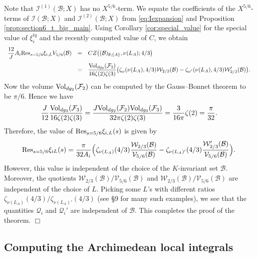 \documentclass{article}
\def\Res{{\rm Res}}
\def\Vol{{\rm Vol}}
\def\cB{{\mathcal B}}
\def\FF{{\mathcal F}}
\def\V{{\mathcal V}}
\def\I{{\mathcal I}}
\def\W{{\mathcal W}}
\newenvironment{proof}{\noindent {\bf Proof:}}{$\Box$ \vspace{2 ex}}
\begin{document}
\begin{proof}
Note that $\I^{(1)}(\cB;X)$ has no $X^{5/6}$-term. We equate the coefficients of the $X^{5/6}$-terms of $\I(\cB;X)$ and $\I^{(2)}(\cB;X)$ from \eqref{eq:Iexpansion} and Proposition \ref{prop:section6_t_big_main}. Using Corollary \ref{cor:special_value} for the special value of $\xi_i^{tq}$ and the recently computed value of $C$, we obtain
\begin{equation*}
\begin{array}{rcl}
\displaystyle\frac{12}{J}A_i\Res_{s=5/6}\xi_{i,L}V_{5/6}(\cB)
&=&\displaystyle
CZ\bigl((\cB)_{\emptyset;\{A\}},\nu(L_A);4/3\bigr)
\\[.15in]&=&\displaystyle
\frac{\Vol_{dg_3}(\FF_3)}{16\zeta(2)\zeta(3)}\bigl(
\zeta_{\omega}(\nu(L_A),4/3)\mathcal W_{2/3}(\cB)
-
\zeta_{\omega'}(\nu(L_A),4/3)\mathcal W_{2/3}'(\cB)
\bigr).
\end{array}
\end{equation*}
Now the volume $\Vol_{dg_2}(\FF_2)$ can be computed by the Gauss--Bonnet theorem to be $\pi/6$. Hence we have 
$$\frac{J}{12}\frac{\Vol_{dg_3}(\FF_3)}{16\zeta(2)\zeta(3)}=\frac{J\Vol_{dg_2}(\FF_2)\Vol_{dg_3}(\FF_3)}{32\pi\zeta(2)\zeta(3)}=\frac{3}{16\pi}\zeta(2)=\frac{\pi}{32}.$$
Therefore, the value of $\Res_{s=5/6}\xi_{i,L}(s)$ is
given by
\begin{equation*}
\Res_{s=5/6}\xi_{iL}(s)=\frac{\pi}{32A_i}
\Bigl(
\zeta_{\nu(L_A)}(4/3)
\frac{\mathcal W_{2/3}(\cB)}{\V_{5/6}(\cB)}
-
\zeta_{\nu(L_A)'}(4/3)
\frac{\mathcal W_{2/3}'(\cB)}{\V_{5/6}(\cB)}
\Bigr).
\end{equation*}
However, this value is independent of the choice of the $K$-invariant set $\cB$. Moreover, the quotients $\W_{2/3}(\cB)/\V_{5/6}(\cB)$ and $\W_{2/3}(\cB)/\V_{5/6}(\cB)$ are independent of the choice of $L$. Picking some $L$'s with different ratios $\zeta_{\nu(L_A)}(4/3)/\zeta_{\nu(L_A)'}(4/3)$ (see \S9 for many such examples), we see that the quantities $\mathcal Q_i$ and $\mathcal Q_i'$ are independent of $\cB$. 
This completes the proof of the theorem.
\end{proof}


\subsection{Computing the Archimedean local integrals}
\end{document}
